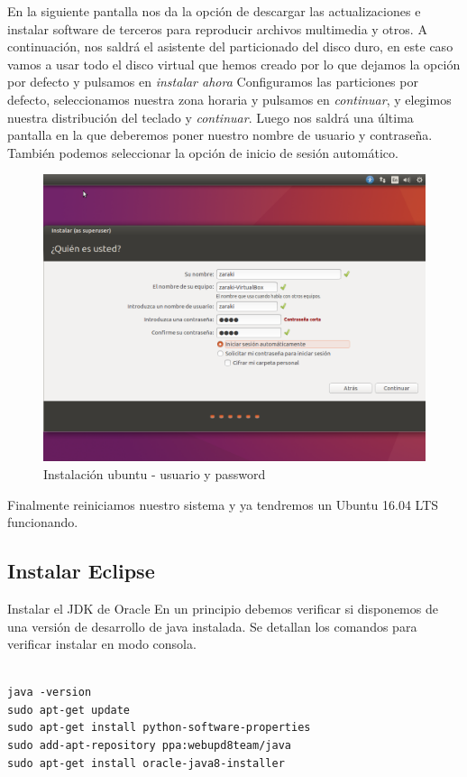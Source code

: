 En la siguiente pantalla nos da la opción de descargar las actualizaciones e instalar software de terceros para reproducir archivos multimedia y otros. A continuación, nos saldrá el asistente del particionado del disco duro, en este caso vamos a usar todo el disco virtual que hemos creado por lo que dejamos la opción por defecto y pulsamos en \textit{instalar ahora}
Configuramos las particiones por defecto, seleccionamos nuestra zona horaria y pulsamos en \textit{continuar}, y elegimos nuestra distribución del teclado y \textit{continuar}. Luego nos saldrá una última pantalla en la que deberemos poner nuestro nombre de usuario y contraseña. También podemos seleccionar la opción de inicio de sesión automático.

\begin{figure}[H]
	\centering
	\includegraphics[width=0.8\linewidth]{figuras/vm-5}
	\caption{Instalación ubuntu - usuario y password}
	\label{fig:vm5}
\end{figure}

Finalmente reiniciamos nuestro sistema y ya tendremos un Ubuntu 16.04 LTS funcionando.

\subsection{Instalar Eclipse}
Instalar el JDK de Oracle
En un principio debemos verificar si disponemos de una versión de desarrollo de java instalada. Se detallan los comandos para verificar instalar en modo consola.

\begin{lstlisting}

java -version
sudo apt-get update
sudo apt-get install python-software-properties
sudo add-apt-repository ppa:webupd8team/java
sudo apt-get install oracle-java8-installer
\end{lstlisting}

